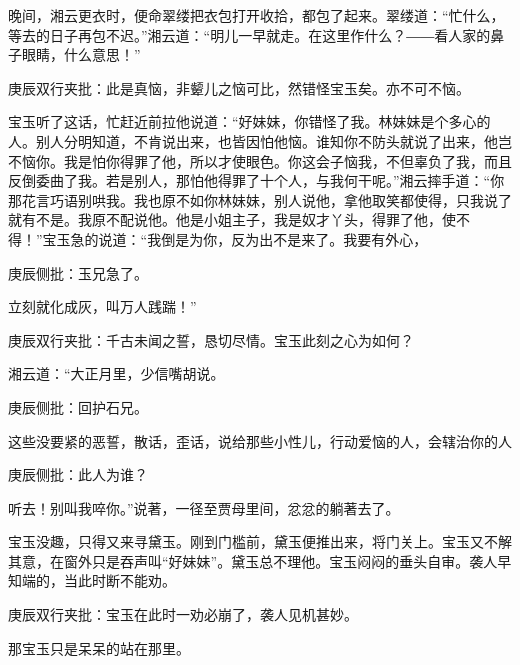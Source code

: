 \begin{parag}


    晚间，湘云更衣时，便命翠缕把衣包打开收拾，都包了起来。翠缕道：“忙什么，等去的日子再包不迟。”湘云道：“明儿一早就走。在这里作什么？――看人家的鼻子眼睛，什么意思！”\begin{note}庚辰双行夹批：此是真恼，非颦儿之恼可比，然错怪宝玉矣。亦不可不恼。\end{note}宝玉听了这话，忙赶近前拉他说道：“好妹妹，你错怪了我。林妹妹是个多心的人。别人分明知道，不肯说出来，也皆因怕他恼。谁知你不防头就说了出来，他岂不恼你。我是怕你得罪了他，所以才使眼色。你这会子恼我，不但辜负了我，而且反倒委曲了我。若是别人，那怕他得罪了十个人，与我何干呢。”湘云摔手道：“你那花言巧语别哄我。我也原不如你林妹妹，别人说他，拿他取笑都使得，只我说了就有不是。我原不配说他。他是小姐主子，我是奴才丫头，得罪了他，使不得！”宝玉急的说道：“我倒是为你，反为出不是来了。我要有外心，\begin{note}庚辰侧批：玉兄急了。\end{note}立刻就化成灰，叫万人践踹！”\begin{note}庚辰双行夹批：千古未闻之誓，恳切尽情。宝玉此刻之心为如何？\end{note}湘云道：“大正月里，少信嘴胡说。\begin{note}庚辰侧批：回护石兄。\end{note}这些没要紧的恶誓，散话，歪话，说给那些小性儿，行动爱恼的人，会辖治你的人\begin{note}庚辰侧批：此人为谁？\end{note}听去！别叫我啐你。”说著，一径至贾母里间，忿忿的躺著去了。
\end{parag}


\begin{parag}


    宝玉没趣，只得又来寻黛玉。刚到门槛前，黛玉便推出来，将门关上。宝玉又不解其意，在窗外只是吞声叫“好妹妹”。黛玉总不理他。宝玉闷闷的垂头自审。袭人早知端的，当此时断不能劝。\begin{note}庚辰双行夹批：宝玉在此时一劝必崩了，袭人见机甚妙。\end{note}那宝玉只是呆呆的站在那里。
\end{parag}


